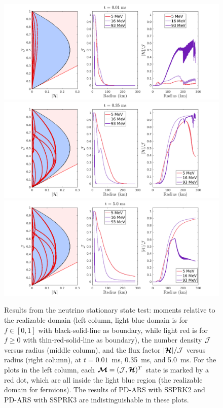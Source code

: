 \begin{figure}[h]
  \centering
    \includegraphics[width=\textwidth]{figures/NSS_1_1}\\
    \includegraphics[width=\textwidth]{figures/NSS_3_1} \\
    \includegraphics[width=\textwidth]{figures/NSS_5_1} \\
    \caption{Results from the neutrino stationary state test: moments relative to the realizable domain (left column, light blue domain is for $f \in [0,1]$ with black-solid-line as boundary, while light red is for $f\geq 0$ with thin-red-solid-line as boundary), the number density $\mathcal{J}$ versus radius (middle column), and the flux factor $|\boldsymbol{\mathcal{H}}|/\mathcal{J}$ versus radius (right column), at $t = 0.01$~ms, 0.35~ms, and 5.0~ms.  For the plots in the left column, each $\boldsymbol{\mathcal{M}}=(\mathcal{J},\boldsymbol{\mathcal{H}})^{T}$ state is marked by a red dot, which are all inside the light blue region (the realizable domain for fermions).  The results of PD-ARS with SSPRK2 and PD-ARS with SSPRK3 are indistinguishable in these plots.}
    \label{fig:NeutrinoStationaryTestEvolve}
\end{figure}